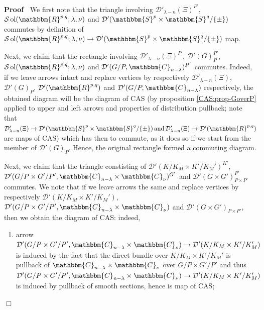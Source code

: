 \documentclass{article}
\newcommand{\nobracket}{}
\newcommand{\tmop}[1]{\ensuremath{\operatorname{#1}}}
\newenvironment{proof}{\noindent\textbf{Proof\ }}{\hspace*{\fill}$\Box$\medskip}
\begin{document}
\begin{proof}
  We first note that the triangle involving $\mathcal{D}'_{\lambda - n}
  (\Xi)^{P'}$, $\mathcal{S} \tmop{ol} (\mathbbm{R}^{p, q} ; \lambda, \nu)$ and
  $\mathcal{D}' (\mathbbm{S}^p \times \mathbbm{S}^q / \{ \pm \})$ commutes by
  definition of $\mathcal{S} \tmop{ol} (\mathbbm{R}^{p, q} ; \lambda, \nu)
  \rightarrow \mathcal{D}' (\mathbbm{S}^p \times \mathbbm{S}^q / \{ \pm \})$
  map.
  
  Next, we claim that the rectangle involving $\mathcal{D}'_{\lambda - n}
  (\Xi)^{P'}$, $\mathcal{D}' (G)_P^{P'}$, $\mathcal{S} \tmop{ol}
  (\mathbbm{R}^{p, q} ; \lambda, \nu)$ and $\mathcal{D}' (G / P,
  \mathbbm{C}_{n - \lambda})^{P'}$ commutes. Indeed, if we leave arrows intact
  and replace vertices by respectively $\mathcal{D}'_{\lambda - n} (\Xi)$,
  $\mathcal{D}' (G)_P$, $\mathcal{D}' (\mathbbm{R}^{p, q})$ and $\mathcal{D}'
  (G / P, \mathbbm{C}_{n - \lambda})$ respectively, the obtained diagram will
  be the diagram of CAS (by proposition \ref{CAS:prop-GoverP} applied to upper
  and left arrows and properties of distribution pullback; note that
  $\mathcal{D}'_{\lambda - n} (\Xi) \rightarrow \mathcal{D}' (\mathbbm{S}^p
  \times \mathbbm{S}^q / \{ \pm \}) \tmop{and} \mathcal{D}'_{\lambda - n}
  (\Xi) \rightarrow \mathcal{D}' (\mathbbm{R}^{p, q})$ are maps of CAS) which
  has then to commute, as it does so if we start from the member of
  $\mathcal{D}' (G)_P$. Hence, the original rectangle formed a commuting
  diagram.
  
  Next, we claim that the triangle constisting of $\mathcal{D}' (K / K_M
  \times K' / K_M')^{K'}$, $\mathcal{D}' (G / P \times G' / P', \mathbbm{C}_{n
  - \lambda} \times \mathbbm{C}_{\nu})^{G'}$ and $\mathcal{D}' (G \times
  G')_{P \times P'}^{P'}$ commutes. We note that if we leave arrows the same
  and replace vertices by respectively $\mathcal{D}' (K / K_M \times K' /
  K_M')$, $\mathcal{D}' (G / P \times G' / P', \mathbbm{C}_{n - \lambda}
  \nobracket \times \mathbbm{C}_{\nu} \nobracket)$ and $\mathcal{D}' (G
  \nobracket \times G' \nobracket)_{P \times P'}$, then we obtain the diagram
  of CAS: indeed,
  \begin{enumerate}
    \item arrow $\mathcal{D}' (G / P \times G' / P', \mathbbm{C}_{n - \lambda}
    \times \mathbbm{C}_{\nu})_{} \rightarrow \mathcal{D}' (K / K_M \times K' /
    K_M')$ is induced by the fact that the direct bundle over $K / K_M \times
    K' / K_M'$ is pullback of $\mathbbm{C}_{n - \lambda} \times
    \mathbbm{C}_{\nu}$ over $G / P \times G' / P'$ and thus $\mathcal{D}' (G /
    P \times G' / P', \mathbbm{C}_{n - \lambda} \times \mathbbm{C}_{\nu})_{}
    \rightarrow \mathcal{D}' (K / K_M \times K' / K_M')$ is induced by
    pullback of smooth sections, hence is map of CAS;
    

\end{enumerate}
\end{proof}
\end{document}
